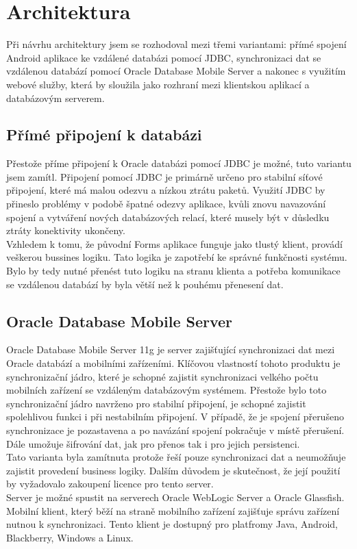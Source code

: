\documentclass{diplomka}
\begin{document}
\section{Architektura}
Při návrhu architektury jsem se rozhodoval mezi třemi variantami: přímé spojení Android aplikace ke vzdálené databázi pomocí JDBC, synchronizaci dat se vzdálenou databází pomocí Oracle Database Mobile Server a nakonec s využitím webové služby, která by sloužila jako rozhraní mezi klientskou aplikací a databázovým serverem.

\subsection{Přímé připojení k databázi}
Přestože příme připojení k Oracle databázi pomocí JDBC je možné, tuto variantu jsem zamítl. Připojení pomocí JDBC je primárně určeno pro stabilní síťové připojení, které má malou odezvu a nízkou ztrátu paketů. Využití JDBC by přineslo problémy v podobě špatné odezvy aplikace, kvůli znovu navazování spojení a vytváření nových databázových relací, které musely být v důsledku ztráty konektivity ukončeny.\\ \indent
Vzhledem k tomu, že původní Forms aplikace funguje jako tlustý klient, provádí veškerou bussines logiku. Tato logika je zapotřebí ke správné funkčnosti systému. Bylo by tedy nutné přenést tuto logiku na stranu klienta a potřeba komunikace se vzdálenou databází by byla větší než k pouhému přenesení dat.

\subsection{Oracle Database Mobile Server}
Oracle Database Mobile Server 11g\cite{mobile} je server zajišťující  synchronizaci dat mezi Oracle databází a mobilními zařízeními. Klíčovou vlastností tohoto produktu je synchronizační jádro, které je schopné zajistit synchronizaci velkého počtu mobilních zařízení se vzdáleným databázovým systémem. Přestože bylo toto synchronizační jádro navrženo pro stabilní připojení, je schopné zajistit spolehlivou funkci i při nestabilním připojení. V případě, že je spojení přerušeno synchronizace je pozastavena a po navázání spojení pokračuje v místě přerušení. Dále umožuje šifrování dat, jak pro přenos tak i pro jejich persistenci.\\ \indent
Tato varianta byla zamítnuta protože řeší pouze synchronizaci dat a neumožňuje zajistit provedení business logiky. Dalším důvodem je skutečnost, že její použití by vyžadovalo zakoupení licence pro tento server.\\ \indent
Server je možné spustit na serverech Oracle WebLogic Server a Oracle Glassfish. Mobilní klient, který běží na straně mobilního zařízení zajišťuje správu zařízení nutnou k synchronizaci. Tento klient je dostupný pro platfromy Java, Android, Blackberry, Windows a Linux.
\end{document}
